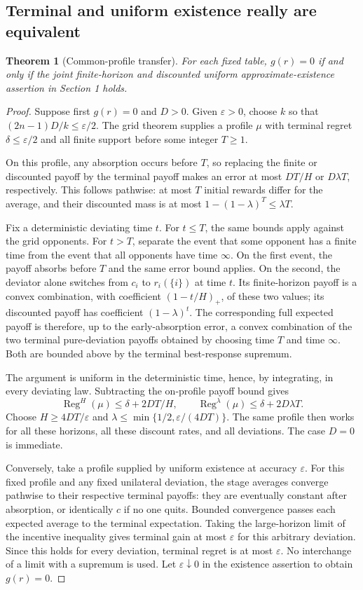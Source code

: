 \documentclass[11pt,a4paper]{article}
\DeclareMathOperator{\Reg}{Reg}
\newtheorem{theorem}{Theorem}[section]
\theoremstyle{definition}
\theoremstyle{remark}
\begin{document}
\subsection{Terminal and uniform existence really are equivalent}
\begin{theorem}[Common-profile transfer]
For each fixed table, $g(r)=0$ if and only if the joint finite-horizon and discounted uniform approximate-existence assertion in Section 1 holds.
\end{theorem}
\begin{proof}
Suppose first $g(r)=0$ and $D>0$. Given $\varepsilon>0$, choose $k$ so that $(2n-1)D/k\leq\varepsilon/2$. The grid theorem supplies a profile $\mu$ with terminal regret $\delta\leq\varepsilon/2$ and all finite support before some integer $T\geq1$.

On this profile, any absorption occurs before $T$, so replacing the finite or discounted payoff by the terminal payoff makes an error at most $DT/H$ or $D\lambda T$, respectively. This follows pathwise: at most $T$ initial rewards differ for the average, and their discounted mass is at most $1-(1-\lambda)^T\leq\lambda T$.

Fix a deterministic deviating time $t$. For $t\leq T$, the same bounds apply against the grid opponents. For $t>T$, separate the event that some opponent has a finite time from the event that all opponents have time $\infty$. On the first event, the payoff absorbs before $T$ and the same error bound applies. On the second, the deviator alone switches from $c_i$ to $r_i(\{i\})$ at time $t$. Its finite-horizon payoff is a convex combination, with coefficient $(1-t/H)_+$, of these two values; its discounted payoff has coefficient $(1-\lambda)^t$. The corresponding full expected payoff is therefore, up to the early-absorption error, a convex combination of the two terminal pure-deviation payoffs obtained by choosing time $T$ and time $\infty$. Both are bounded above by the terminal best-response supremum.

The argument is uniform in the deterministic time, hence, by integrating, in every deviating law. Subtracting the on-profile payoff bound gives
\[
 \Reg^H(\mu)\leq\delta+2DT/H,
 \qquad \Reg^\lambda(\mu)\leq\delta+2D\lambda T.
\]
Choose $H\geq4DT/\varepsilon$ and $\lambda\leq\min\{1/2,\varepsilon/(4DT)\}$. The same profile then works for all these horizons, all these discount rates, and all deviations. The case $D=0$ is immediate.

Conversely, take a profile supplied by uniform existence at accuracy $\varepsilon$. For this fixed profile and any fixed unilateral deviation, the stage averages converge pathwise to their respective terminal payoffs: they are eventually constant after absorption, or identically $c$ if no one quits. Bounded convergence passes each expected average to the terminal expectation. Taking the large-horizon limit of the incentive inequality gives terminal gain at most $\varepsilon$ for this arbitrary deviation. Since this holds for every deviation, terminal regret is at most $\varepsilon$. No interchange of a limit with a supremum is used. Let $\varepsilon\downarrow0$ in the existence assertion to obtain $g(r)=0$.
\end{proof}
\end{document}
